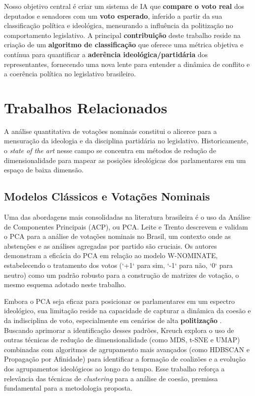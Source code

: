 \documentclass[conference]{IEEEtran}
\begin{document}
Nosso objetivo central é criar um sistema de IA que \textbf{compare o voto real} dos deputados e senadores com um \textbf{voto esperado}, inferido a partir da sua classificação política e ideológica, mensurando a influência da politização no comportamento legislativo. A principal \textbf{contribuição} deste trabalho reside na criação de um \textbf{algoritmo de classificação} que oferece uma métrica objetiva e contínua para quantificar a \textbf{aderência ideológica/partidária} dos representantes, fornecendo uma nova lente para entender a dinâmica de conflito e a coerência política no legislativo brasileiro.

\section{Trabalhos Relacionados}
\label{sec:related_work}

A análise quantitativa de votações nominais constitui o alicerce para a mensuração da ideologia e da disciplina partidária no legislativo. Historicamente, o \textit{state of the art} nesse campo se concentra em métodos de redução de dimensionalidade para mapear as posições ideológicas dos parlamentares em um espaço de baixa dimensão.

\subsection{Modelos Clássicos e Votações Nominais}
Uma das abordagens mais consolidadas na literatura brasileira é o uso da Análise de Componentes Principais (ACP), ou PCA. Leite e Trento \cite{leite2016} descrevem e validam o PCA para a análise de votações nominais no Brasil, um contexto onde as abstenções e as análises agregadas por partido são cruciais. Os autores demonstram a eficácia do PCA em relação ao modelo W-NOMINATE, estabelecendo o tratamento dos votos (`+1` para sim, `-1` para não, `0` para neutro) como um padrão robusto para a construção de matrizes de votação, o mesmo esquema adotado neste trabalho.

Embora o PCA seja eficaz para posicionar os parlamentares em um espectro ideológico, sua limitação reside na capacidade de capturar a dinâmica da coesão e da indisciplina de voto, especialmente em cenários de alta \textbf{politização} \cite{ribeiro2023}. Buscando aprimorar a identificação desses padrões, Kreuch \cite{kreuch2024} explora o uso de outras técnicas de redução de dimensionalidade (como MDS, t-SNE e UMAP) combinadas com algoritmos de agrupamento mais avançados (como HDBSCAN e Propagação por Afinidade) para identificar a formação de coalizões e a evolução dos agrupamentos ideológicos ao longo do tempo. Esse trabalho reforça a relevância das técnicas de \textit{clustering} para a análise de coesão, premissa fundamental para a metodologia proposta.
\end{document}
